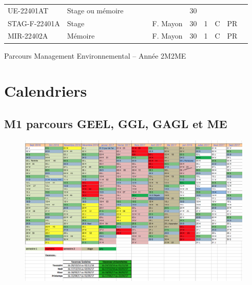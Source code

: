 \documentclass[a4paper,11pt]{article}
\begin{document}
{{\begin{tabular}{lllllllllll}
\rowcolor[HTML]{EFEFEF} 
UE-22401AT                         & Stage ou mémoire                                                  &    &    &                           &                                    & 30   &      &             &                                       &                           \\
STAG-F-22401A                      & Stage                                                             &    &    &                           & F. Mayon                           & 30   & 1    & C           & PR                                    &                           \\
MIR-22402A                         & Mémoire                                                           &    &    &                           & F. Mayon                           & 30   & 1    & C           & PR                                    &                          
\end{tabular}}
}{Parcours Management Environnemental -- Année 2}{M2ME}



\section{Calendriers}\label{Calendrier}

\subsection{M1 parcours GEEL, GGL, GAGL et ME}
\begin{figure}[H]
	\centering
		\includegraphics[width=1.4\textwidth, angle=90]{Calendriers/calendrierM1.png}
	\label{calM1}
\end{figure}
\end{document}
